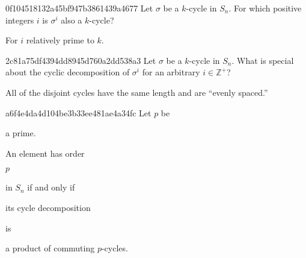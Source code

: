 \begin{note}{0f104518132a45bf947b3861439a4677}
    Let \({ \sigma }\) be a \({ k }\)-cycle in \({ S_n }\).
    For which positive integers \({ i }\) is \({ \sigma^{i} }\) also a \({ k }\)-cycle?

    \begin{cloze}{1}
        For \({ i }\) relatively prime to \({ k }\).
    \end{cloze}
\end{note}

\begin{note}{2c81a75df4394dd8945d760a2dd538a3}
    Let \({ \sigma }\) be a \({ k }\)-cycle in \({ S_n }\).
    What is special about the cyclic decomposition of \({ \sigma^{i} }\) for an arbitrary \({ i \in \mathbb Z^{+} }\)?

    \begin{cloze}{1}
        All of the disjoint cycles have the same length and are ``evenly spaced.''
    \end{cloze}
\end{note}

\begin{note}{a6f4e4da4d104be3b33ee481ae4a34fc}
    Let \({ p }\) be \begin{icloze}{3}a prime.\end{icloze} An element has order \begin{icloze}{2}\({ p }\)\end{icloze} in \({ S_n }\) if and only if \begin{icloze}{4}its cycle decomposition\end{icloze} is \begin{icloze}{1}a product of commuting \({ p }\)-cycles.\end{icloze}
\end{note}


